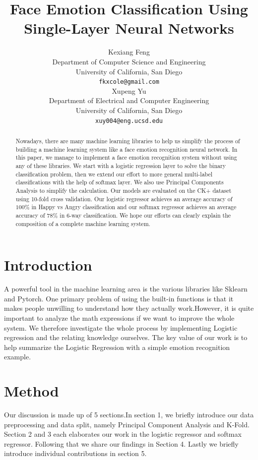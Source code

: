 \documentclass{article} %
\title{Face Emotion Classification Using Single-Layer Neural Networks}
\author{
Kexiang Feng \\
Department of Computer Science and Engineering\\
University of California, San Diego\\
\texttt{fkxcole@gmail.com} \\
\And
Xupeng Yu \\
Department of Electrical and Computer Engineering \\
University of California, San Diego \\
\texttt{xuy004@eng.ucsd.edu}
}
\begin{document}
\maketitle

\begin{abstract}
Nowadays, there are many machine learning libraries to help us simplify the process of building a machine learning system like a face emotion recognition neural network. In this paper, we manage to implement a face emotion recognition system without using any of these libraries. We start with a logistic regression layer to solve the binary classification problem, then we extend our effort to more general multi-label classifications with the help of softmax layer. We also use Principal Components Analysis to simplify the calculation. Our models are evaluated on the CK+ dataset using 10-fold cross validation. Our logistic regressor achieves an average accuracy of $ 100\% $ in Happy vs Angry classification and our softmax regressor achieves an average accuracy of 78\% in 6-way classification. We hope our efforts can clearly explain the composition of a complete machine learning system. 
\end{abstract}

\section{Introduction}
A powerful tool in the machine learning area is the various libraries like Sklearn and Pytorch. One primary problem of using the built-in functions is that it makes people unwilling to understand how they actually work.However, it is quite important to analyze the math expressions if we want to improve the whole system. We therefore investigate the whole process by implementing Logistic regression and the relating knowledge ourselves. The key value of our work is to help summarize the Logistic Regression with a simple emotion recognition example.

\section{Method}
Our discussion is made up of 5 sections.In section 1, we briefly introduce our data preprocessing and data split, namely Principal Component Analysis and K-Fold. Section 2 and 3 each elaborates our work in the logistic regressor and softmax regressor. Following that we share our findings in Section 4. Lastly we briefly introduce individual contributions in section 5.
\end{document}
